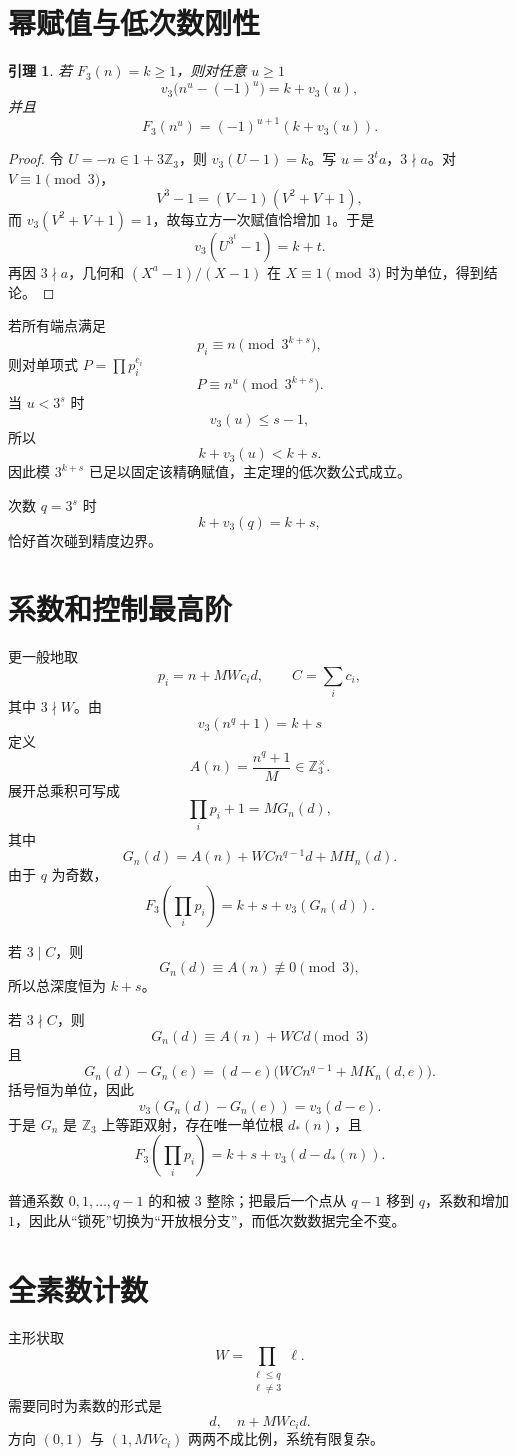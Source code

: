 \documentclass[11pt,a4paper]{ctexart}
\newtheorem{lemma}{引理}
\newcommand{\Fthree}{F_3}
\newcommand{\vthree}{v_3}
\begin{document}
\section{幂赋值与低次数刚性}
\begin{lemma}
若 \(F_3(n)=k\ge1\)，则对任意 \(u\ge1\)
\[
\vthree\bigl(n^u-(-1)^u\bigr)=k+\vthree(u),
\]
并且
\[
F_3(n^u)=(-1)^{u+1}(k+\vthree(u)).
\]
\end{lemma}
\begin{proof}
令 \(U=-n\in1+3\mathbb Z_3\)，则 \(v_3(U-1)=k\)。写 \(u=3^ta\)，\(3\nmid a\)。对 \(V\equiv1\pmod3\)，
\[
V^3-1=(V-1)(V^2+V+1),
\]
而 \(v_3(V^2+V+1)=1\)，故每立方一次赋值恰增加 \(1\)。于是
\[
v_3(U^{3^t}-1)=k+t.
\]
再因 \(3\nmid a\)，几何和 \((X^a-1)/(X-1)\) 在 \(X\equiv1\pmod3\) 时为单位，得到结论。
\end{proof}

若所有端点满足
\[
p_i\equiv n\pmod{3^{k+s}},
\]
则对单项式 \(P=\prod p_i^{e_i}\)
\[
P\equiv n^u\pmod{3^{k+s}}.
\]
当 \(u<3^s\) 时
\[
\vthree(u)\le s-1,
\]
所以
\[
k+\vthree(u)<k+s.
\]
因此模 \(3^{k+s}\) 已足以固定该精确赋值，主定理的低次数公式成立。

次数 \(q=3^s\) 时
\[
k+\vthree(q)=k+s,
\]
恰好首次碰到精度边界。

\section{系数和控制最高阶}
更一般地取
\[
p_i=n+MWc_i d,\qquad C=\sum_i c_i,
\]
其中 \(3\nmid W\)。由
\[
v_3(n^q+1)=k+s
\]
定义
\[
A(n)=\frac{n^q+1}{M}\in\mathbb Z_3^\times.
\]
展开总乘积可写成
\[
\prod_i p_i+1=M G_n(d),
\]
其中
\[
\boxed{
G_n(d)=A(n)+WCn^{q-1}d+M H_n(d).
}
\]
由于 \(q\) 为奇数，
\[
\Fthree\!\left(\prod_i p_i\right)=k+s+v_3(G_n(d)).
\]

若 \(3\mid C\)，则
\[
G_n(d)\equiv A(n)\not\equiv0\pmod3,
\]
所以总深度恒为 \(k+s\)。

若 \(3\nmid C\)，则
\[
G_n(d)\equiv A(n)+WCd\pmod3
\]
且
\[
G_n(d)-G_n(e)
=(d-e)\bigl(WCn^{q-1}+MK_n(d,e)\bigr).
\]
括号恒为单位，因此
\[
v_3(G_n(d)-G_n(e))=v_3(d-e).
\]
于是 \(G_n\) 是 \(\mathbb Z_3\) 上等距双射，存在唯一单位根 \(d_*(n)\)，且
\[
\boxed{
\Fthree\!\left(\prod_i p_i\right)
=
k+s+v_3(d-d_*(n)).
}
\]

普通系数 \(0,1,\ldots,q-1\) 的和被 \(3\) 整除；把最后一个点从 \(q-1\) 移到 \(q\)，系数和增加 \(1\)，因此从“锁死”切换为“开放根分支”，而低次数数据完全不变。

\section{全素数计数}
主形状取
\[
W=\prod_{\substack{\ell\le q\\\ell\ne3}}\ell.
\]
需要同时为素数的形式是
\[
d,\quad n+MWc_i d.
\]
方向 \((0,1)\) 与 \((1,MWc_i)\) 两两不成比例，系统有限复杂。
\end{document}
